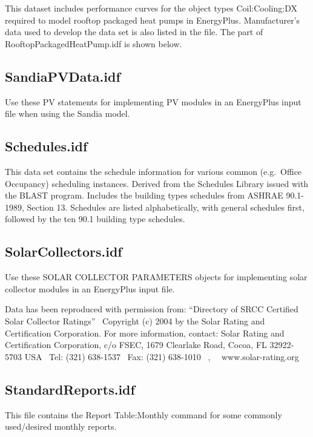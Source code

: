 This dataset includes performance curves for the object types Coil:Cooling:DX required to model rooftop packaged heat pumps in EnergyPlus. Manufacturer's data used to develop the data set is also listed in the file. The part of RooftopPackagedHeatPump.idf is shown below.

\subsection{SandiaPVData.idf}\label{sandiapvdata.idf-000}

Use these PV statements for implementing PV modules in an EnergyPlus input file when using the Sandia model.

\subsection{Schedules.idf}\label{schedules.idf}

This data set contains the schedule information for various common (e.g.~Office Occupancy) scheduling instances. Derived from the Schedules Library issued with the BLAST program. Includes the building types schedules from ASHRAE 90.1-1989, Section 13. Schedules are listed alphabetically, with general schedules first, followed by the ten 90.1 building type schedules.

\subsection{SolarCollectors.idf}\label{solarcollectors.idf-000}

Use these SOLAR COLLECTOR PARAMETERS objects for implementing solar collector modules in an EnergyPlus input file.

Data has been reproduced with permission from: ``Directory of SRCC Certified Solar Collector Ratings''~ Copyright (c) 2004 by the Solar Rating and Certification Corporation. For more information, contact: Solar Rating and Certification Corporation, c/o FSEC, 1679 Clearlake Road, Cocoa, FL 32922-5703 USA~ Tel: (321) 638-1537~ Fax: (321) 638-1010~ ,~~ www.solar-rating.org

\subsection{StandardReports.idf}\label{standardreports.idf}

This file contains the Report Table:Monthly command for some commonly used/desired monthly reports.

